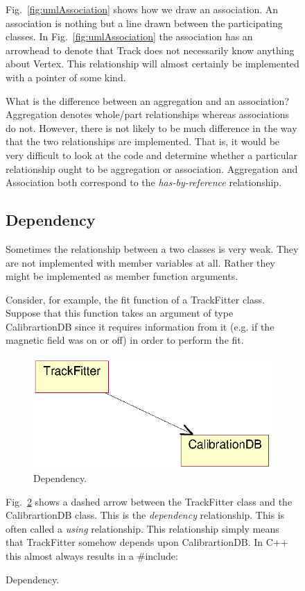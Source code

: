 \documentclass[twoside]{article}
\begin{document}
\begin{figure}[htb]
\begin{center}
Fig.~\ref{fig:umlAssociation} shows how we draw an association.  An
association is nothing but a line drawn between the participating
classes. In Fig.~\ref{fig:umlAssociation} the association has an
arrowhead to denote that Track does not necessarily know anything
about Vertex. This relationship will almost certainly be implemented
with a pointer of some kind.

What is the difference between an aggregation and an association?
Aggregation denotes whole/part relationships whereas associations do
not. However, there is not likely to be much difference in the way
that the two relationships are implemented.  That is, it would be very
difficult to look at the code and determine whether a particular
relationship ought to be aggregation or association.  Aggregation and
Association both correspond to the \emph{has-by-reference}
relationship.

\subsection{Dependency}

Sometimes the relationship between a two classes is very weak. They
are not implemented with member variables at all. Rather they might be
implemented as member function arguments.

Consider, for example, the fit function of a TrackFitter class.
Suppose that this function takes an argument of type CalibrartionDB
since it requires information from it (e.g. if the magnetic field was
on or off) in order to perform the fit.
\begin{figure}[htb]
    \begin{center}
        \includegraphics{umlDependency.eps}
        \caption{Dependency.}
        \label{fig:umlDependency}
    \end{center}
\end{figure}
Fig.~\ref{fig:umlDependency} shows a dashed arrow between the
TrackFitter class and the CalibrartionDB class. This is the
\emph{dependency} relationship. This is often called a \emph{using}
relationship.  This relationship simply means that TrackFitter somehow
depends upon CalibrartionDB. In C++ this almost always results in a
\#include:


\end{center}
\end{figure}
\end{document}
